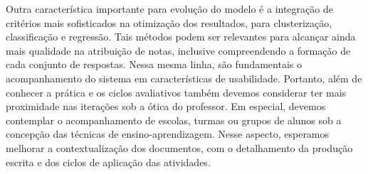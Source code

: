 Outra característica importante para evolução do modelo é a integração de critérios mais sofisticados na otimização dos resultados, para clusterização, classificação e regressão. Tais métodos podem ser relevantes para alcançar ainda mais qualidade na atribuição de notas, inclusive compreendendo a formação de cada conjunto de respostas. Nessa mesma linha, são fundamentais o acompanhamento do sistema em características de usabilidade. Portanto, além de conhecer a prática e os ciclos avaliativos também devemos considerar ter mais proximidade nas iterações sob a ótica do professor. Em especial, devemos contemplar o acompanhamento de escolas, turmas ou grupos de alunos sob a concepção das técnicas de ensino-aprendizagem. Nesse aspecto, esperamos melhorar a contextualização dos documentos, com o detalhamento da produção escrita e dos ciclos de aplicação das atividades.